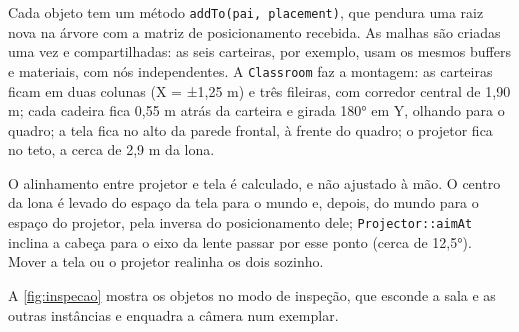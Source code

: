 \documentclass[
  12pt,          %
  oneside,       %
  a4paper,       %
  chapter=TITLE, %
  english,
  brazil,        %
]{abntex2}
\begin{document}
Cada objeto tem um método \texttt{addTo(pai, placement)}, que pendura uma raiz nova na árvore com a matriz de
posicionamento recebida. As malhas são criadas uma vez e compartilhadas: as seis carteiras, por exemplo, usam
os mesmos buffers e materiais, com nós independentes. A \texttt{Classroom} faz a montagem: as carteiras ficam
em duas colunas (X = ±1,25 m) e três fileiras, com corredor central de 1,90 m; cada cadeira fica 0,55 m atrás
da carteira e girada 180° em Y, olhando para o quadro; a tela fica no alto da parede frontal, à frente do
quadro; o projetor fica no teto, a cerca de 2,9 m da lona.

O alinhamento entre projetor e tela é calculado, e não ajustado à mão. O centro da lona é levado do espaço
da tela para o mundo e, depois, do mundo para o espaço do projetor, pela inversa do posicionamento dele;
\texttt{Projector::aimAt} inclina a cabeça para o eixo da lente passar por esse ponto (cerca de 12,5°). Mover a
tela ou o projetor realinha os dois sozinho.

A \autoref{fig:inspecao} mostra os objetos no modo de inspeção, que esconde a sala e as outras instâncias e
enquadra a câmera num exemplar.
\end{document}
